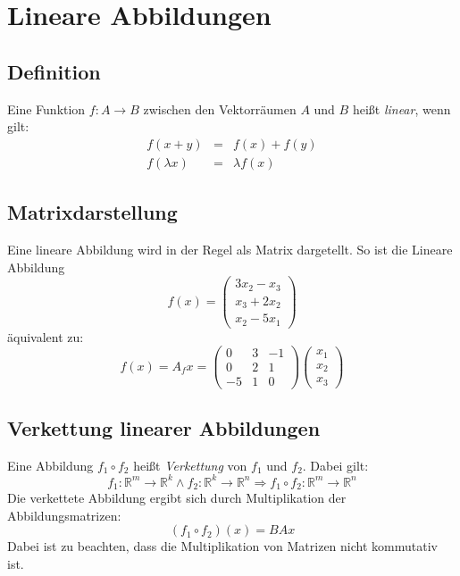 
\section{Lineare Abbildungen}
\label{sec:lineare_abbildungen}

\subsection{Definition}
\label{sub:definition}

Eine Funktion $f : A \to B$ zwischen den Vektorräumen $A$ und $B$ heißt \emph{linear}, wenn gilt:
\begin{eqnarray}
	f(x+y) &=& f(x) + f(y) \\
	f(\lambda x) &=& \lambda f(x)
\end{eqnarray}

\subsection{Matrixdarstellung}
\label{sub:matrixdarstellung}

Eine lineare Abbildung wird in der Regel als Matrix dargetellt. So ist die Lineare Abbildung
\begin{displaymath}
	f(x) = \left(\begin{matrix}3x_2 - x_3\\x_3 + 2x_2\\x_2 - 5x_1\end{matrix}\right)
\end{displaymath}
äquivalent zu: 
\begin{displaymath}
	f(x) = A_fx = \left(\begin{matrix}0 & 3 & -1 \\ 0 & 2 & 1 \\ -5 & 1 & 0\end{matrix}\right) 
	\left(\begin{matrix}x_1\\x_2\\x_3\end{matrix}\right)
\end{displaymath}

\subsection{Verkettung linearer Abbildungen}
\label{sub:verkettung_linearer_abbildungen}

Eine Abbildung $f_1 \circ f_2$ heißt \emph{Verkettung} von $f_1$ und $f_2$. Dabei gilt:
\begin{equation}
	f_1: \mathbb{R}^m \to \mathbb{R}^k    \wedge    f_2: \mathbb{R}^k \to \mathbb{R}^n
	\Rightarrow f_1 \circ f_2 : \mathbb{R}^m \to \mathbb{R}^n
\end{equation}
Die verkettete Abbildung ergibt sich durch Multiplikation der Abbildungsmatrizen: 
\begin{equation}
	(f_1 \circ f_2)(x) = BAx
\end{equation}
Dabei ist zu beachten, dass die Multiplikation von Matrizen nicht kommutativ ist.

